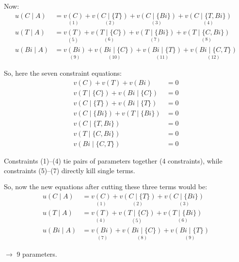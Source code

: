 \documentclass{article}
\begin{document}
Now:
\begin{align*}
    u(C \mid A) &= \underset{(1)}{v(C)} + \underset{(2)}{v(C \mid \{T\})} + \underset{(3)}{v(C \mid \{Bi\})} + \underset{(4)}{v(C \mid \{T, Bi\})} \\[1mm]
    u(T \mid A) &= \underset{(5)}{v(T)} + \underset{(6)}{v(T \mid \{C\})} + \underset{(7)}{v(T \mid \{Bi\})} + \underset{(8)}{v(T \mid \{C, Bi\})} \\[1mm]
    u(Bi \mid A) &= \underset{(9)}{v(Bi)} + \underset{(10)}{v(Bi \mid \{C\})} + \underset{(11)}{v(Bi \mid \{T\})} + \underset{(12)}{v(Bi \mid \{C, T\})}
\end{align*}

So, here the seven constraint equations:
\begin{align}
    v(C) + v(T) + v(Bi) &= 0 \\
    v(T \mid \{C\}) + v(Bi \mid \{C\}) &= 0 \\
    v(C \mid \{T\}) + v(Bi \mid \{T\}) &= 0 \\
    v(C \mid \{Bi\}) + v(T \mid \{Bi\}) &= 0 \\
    v(C \mid \{T, Bi\}) &= 0 \\
    v(T \mid \{C, Bi\}) &= 0 \\
    v(Bi \mid \{C, T\}) &= 0
\end{align}

Constraints (1)--(4) tie pairs of parameters together (4 constraints),
while constraints (5)--(7) directly kill single terms.

So, now the new equations after cutting these three terms would be:
\begin{align*}
    u(C \mid A) &= \underset{(1)}{v(C)} + \underset{(2)}{v(C \mid \{T\})} + \underset{(3)}{v(C \mid \{Bi\})} \\
    u(T \mid A) &= \underset{(4)}{v(T)} + \underset{(5)}{v(T \mid \{C\})} + \underset{(6)}{v(T \mid \{Bi\})} \\
    u(Bi \mid A) &= \underset{(7)}{v(Bi)} + \underset{(8)}{v(Bi \mid \{C\})} + \underset{(9)}{v(Bi \mid \{T\})}
\end{align*}

$\rightarrow$ 9 parameters.


\end{document}
